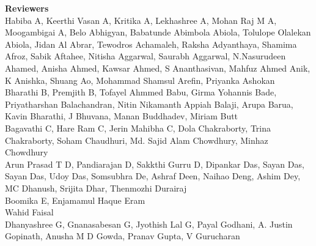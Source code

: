 \documentclass[11pt,oneside]{book}
\begin{document}
\begin{description}
  \item{\bf Reviewers}\vspace{2mm}\\
            Habiba A, Keerthi Vasan A, Kritika A, Lekhashree A, Mohan Raj M A, Moogambigai A, Belo Abhigyan, Babatunde Abimbola Abiola, Tolulope Olalekan Abiola, Jidan Al Abrar, Tewodros Achamaleh, Raksha Adyanthaya, Shamima Afroz, Sabik Aftahee, Nitisha Aggarwal, Saurabh Aggarwal, N.Nasurudeen Ahamed, Anisha Ahmed, Kawsar Ahmed, S Ananthasivan, Mahfuz Ahmed Anik, K Anishka, Shuang Ao, Mohammad Shamsul Arefin, Priyanka Ashokan\\
      \newline
          Bharathi B, Premjith B, Tofayel Ahmmed Babu, Girma Yohannis Bade, Priyatharshan Balachandran, Nitin Nikamanth Appiah Balaji, Arupa Barua, Kavin Bharathi, J Bhuvana, Manan Buddhadev, Miriam Butt\\
      \newline
          Bagavathi C, Hare Ram C, Jerin Mahibha C, Dola Chakraborty, Trina Chakraborty, Soham Chaudhuri, Md. Sajid Alam Chowdhury, Minhaz Chowdhury\\
      \newline
          Arun Prasad T D, Pandiarajan D, Sakkthi Gurru D, Dipankar Das, Sayan Das, Sayan Das, Udoy Das, Somsubhra De, Ashraf Deen, Naihao Deng, Ashim Dey, MC Dhanush, Srijita Dhar, Thenmozhi Durairaj\\
      \newline
          Boomika E, Enjamamul Haque Eram\\
      \newline
          Wahid Faisal\\
      \newline
          Dhanyashree G, Gnanasabesan G, Jyothish Lal G, Payal Godhani, A. Justin Gopinath, Anusha M D Gowda, Pranav Gupta, V Gurucharan\\

\end{description}
\end{document}

